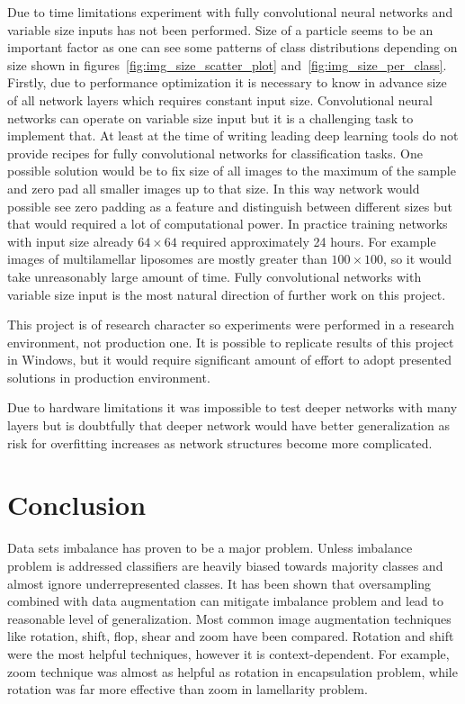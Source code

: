 \documentclass[a4paper, 11pt, table]{article}
\begin{document}
Due to time limitations experiment with fully convolutional neural networks and variable size inputs has not been performed. Size of a particle seems to be an important factor as one can see some patterns of class distributions depending on size shown in figures~\ref{fig:img_size_scatter_plot} and~\ref{fig:img_size_per_class}. Firstly, due to performance optimization it is necessary to know in advance size of all network layers which requires constant input size. Convolutional neural networks can operate on variable size input but it is a challenging task to implement that. At least at the time of writing leading deep learning tools do not provide recipes for fully convolutional networks for classification tasks. One possible solution would be to fix size of all images to the maximum of the sample and zero pad all smaller images up to that size. In this way network would possible see zero padding as a feature and distinguish between different sizes but that would required a lot of computational power. In practice training networks with input size already $64 \times 64$ required approximately 24 hours. For example images of multilamellar liposomes are mostly greater than $100 \times 100$, so it would take unreasonably large amount of time. Fully convolutional networks with variable size input is the most natural direction of further work on this project.

\medskip

This project is of research character so experiments were performed in a research environment, not production one. It is possible to replicate results of this project in Windows, but it would require significant amount of effort to adopt presented solutions in production environment.

\medskip

Due to hardware limitations it was impossible to test deeper networks with many layers but is doubtfully that deeper network would have better generalization as risk for overfitting increases as network structures become more complicated.

\section{Conclusion}

Data sets imbalance has proven to be a major problem. Unless imbalance problem is addressed classifiers are heavily biased towards majority classes and almost ignore underrepresented classes. It has been shown that oversampling combined with data augmentation can mitigate imbalance problem and lead to reasonable level of generalization. Most common image augmentation techniques like rotation, shift, flop, shear and zoom have been compared. Rotation and shift were the most helpful techniques, however it is context-dependent. For example, zoom technique was almost as helpful as rotation in encapsulation problem, while rotation was far more effective than zoom in lamellarity problem. 
\end{document}
